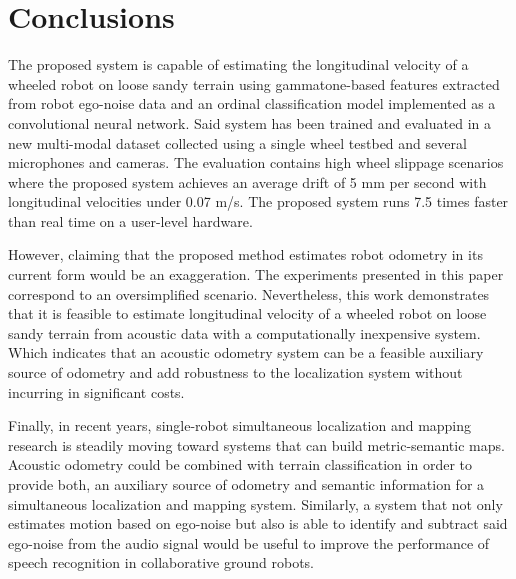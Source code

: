 \section{Conclusions} \label{chap:conclusions}


The proposed system is capable of estimating the longitudinal velocity of a
wheeled robot on loose sandy terrain using gammatone-based features extracted
from robot ego-noise data and an ordinal classification model implemented as a
convolutional neural network. Said system has been trained and evaluated in a
new multi-modal dataset collected using a single wheel testbed and several
microphones and cameras. The evaluation contains high wheel slippage scenarios
where the proposed system achieves an average drift of 5 mm per second with
longitudinal velocities under 0.07 m/s. The proposed system runs 7.5 times
faster than real time on a user-level hardware.


However, claiming that the proposed method estimates robot odometry in its
current form would be an exaggeration. The experiments presented in this paper
correspond to an oversimplified scenario. Nevertheless, this work demonstrates
that it is feasible to estimate longitudinal velocity of a wheeled robot on
loose sandy terrain from acoustic data with a computationally inexpensive
system. Which indicates that an acoustic odometry system can be a feasible
auxiliary source of odometry and add robustness to the localization system
without incurring in significant costs. 




Finally, in recent years, single-robot simultaneous localization and mapping
research is steadily moving toward systems that can build metric-semantic maps.
Acoustic odometry could be combined with terrain classification in order to
provide both, an auxiliary source of odometry and semantic information for a
simultaneous localization and mapping system. Similarly, a system that not only
estimates motion based on ego-noise but also is able to identify and subtract
said ego-noise from the audio signal would be useful to improve the performance
of speech recognition in collaborative ground robots. 